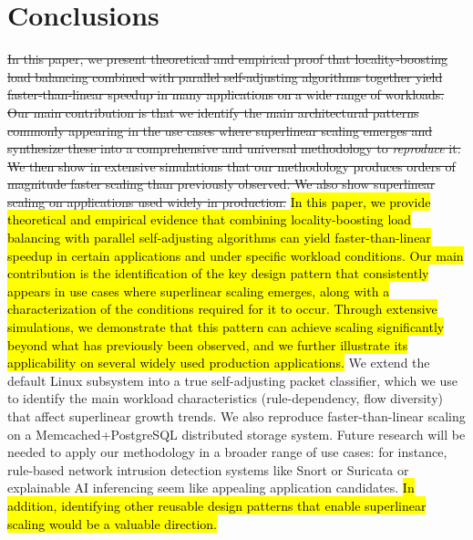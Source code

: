 \section{Conclusions}\label{sec:conclusions}

\sout{In this paper, we present theoretical and empirical proof that locality-boosting load balancing combined with parallel self-adjusting algorithms together yield faster-than-linear speedup in many applications on a wide range of workloads. Our main contribution is that we identify the main architectural patterns commonly appearing in the use cases where superlinear scaling emerges and synthesize these into a comprehensive and universal methodology to \emph{reproduce} it.  We then show in extensive simulations that our methodology produces orders of magnitude faster scaling than previously observed. We also show superlinear scaling on applications used widely in production.} \hl{In this paper, we provide theoretical and empirical evidence that combining locality-boosting load balancing with parallel self-adjusting algorithms can yield faster-than-linear speedup in certain applications and under specific workload conditions. Our main contribution is the identification of the key design pattern that consistently appears in use cases where superlinear scaling emerges, along with a characterization of the conditions required for it to occur. Through extensive simulations, we demonstrate that this pattern can achieve scaling significantly beyond what has previously been observed, and we further illustrate its applicability on several widely used production applications.} We extend the default \nftables Linux subsystem into a true self-adjusting packet classifier, which we use to identify the main workload characteristics (rule-dependency, flow diversity) that affect superlinear growth trends.  We also reproduce faster-than-linear scaling on a Memcached+PostgreSQL distributed storage system. Future research will be needed to apply our methodology in a broader range of use cases: for instance, rule-based network intrusion detection systems like Snort or Suricata \cite{10.5555/2537857.2537883} or explainable AI inferencing seem like appealing application candidates. \hl{In addition, identifying other reusable design patterns that enable superlinear scaling would be a valuable direction.}



